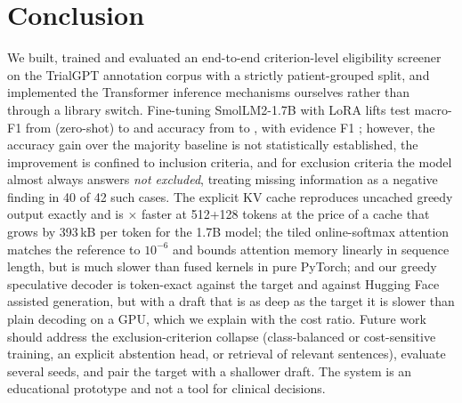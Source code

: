 \section{Conclusion}
We built, trained and evaluated an end-to-end criterion-level eligibility screener on the TrialGPT annotation corpus with a strictly patient-grouped split, and implemented the Transformer inference mechanisms ourselves rather than through a library switch. Fine-tuning SmolLM2-1.7B with LoRA lifts test macro-F1 from \GBaseMF{} (zero-shot) to \GTestMF{} and accuracy from \GBaseAcc{} to \GTestAcc{}, with evidence F1 \GTestEvF{}; however, the accuracy gain over the \GMajAcc{} majority baseline is not statistically established, the improvement is confined to inclusion criteria, and for exclusion criteria the model almost always answers \emph{not excluded}, treating missing information as a negative finding in 40 of 42 such cases. The explicit KV cache reproduces uncached greedy output exactly and is \GKVSpeedup$\times$ faster at 512+128 tokens at the price of a cache that grows by 393\,kB per token for the 1.7B model; the tiled online-softmax attention matches the reference to $10^{-6}$ and bounds attention memory linearly in sequence length, but is much slower than fused kernels in pure PyTorch; and our greedy speculative decoder is token-exact against the target and against Hugging Face assisted generation, but with a draft that is as deep as the target it is slower than plain decoding on a GPU, which we explain with the cost ratio. Future work should address the exclusion-criterion collapse (class-balanced or cost-sensitive training, an explicit abstention head, or retrieval of relevant sentences), evaluate several seeds, and pair the target with a shallower draft. The system is an educational prototype and not a tool for clinical decisions.
